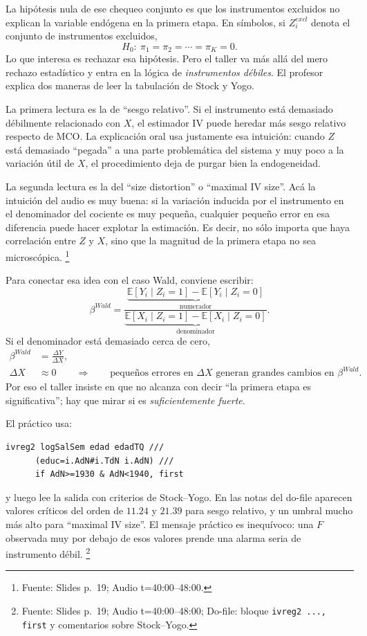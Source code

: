 \documentclass[11pt]{article}
\newcommand{\q}[1]{``#1''}
\newcommand{\E}{\mathbb{E}}
\newcommand{\source}[2]{\footnote{Fuente: Slides p.~#1; Audio t=#2.}}
\newcommand{\sourced}[3]{\footnote{Fuente: Slides p.~#1; Audio t=#2; Do-file: #3.}}
\begin{document}
La hipótesis nula de ese chequeo conjunto es que los instrumentos excluidos no explican la variable endógena en la primera etapa. En símbolos, si \(Z_i^{excl}\) denota el conjunto de instrumentos excluidos,
\[
H_0:\ \pi_1=\pi_2=\cdots=\pi_K=0.
\]
Lo que interesa es rechazar esa hipótesis. Pero el taller va más allá del mero rechazo estadístico y entra en la lógica de \emph{instrumentos débiles}. El profesor explica dos maneras de leer la tabulación de Stock y Yogo.

La primera lectura es la de \q{sesgo relativo}. Si el instrumento está demasiado débilmente relacionado con \(X\), el estimador IV puede heredar más sesgo relativo respecto de MCO. La explicación oral usa justamente esa intuición: cuando \(Z\) está demasiado \q{pegada} a una parte problemática del sistema y muy poco a la variación útil de \(X\), el procedimiento deja de purgar bien la endogeneidad.

La segunda lectura es la del \q{size distortion} o \q{maximal IV size}. Acá la intuición del audio es muy buena: si la variación inducida por el instrumento en el denominador del cociente es muy pequeña, cualquier pequeño error en esa diferencia puede hacer explotar la estimación. Es decir, no sólo importa que haya correlación entre \(Z\) y \(X\), sino que la magnitud de la primera etapa no sea microscópica. \source{19}{40:00--48:00}

Para conectar esa idea con el caso Wald, conviene escribir:
\[
\beta^{Wald}
=
\frac{\underbrace{\E[Y_i\mid Z_i=1]-\E[Y_i\mid Z_i=0]}_{\text{numerador}}}
{\underbrace{\E[X_i\mid Z_i=1]-\E[X_i\mid Z_i=0]}_{\text{denominador}}}.
\]
Si el denominador está demasiado cerca de cero,
\[
\begin{aligned}
\beta^{Wald}
&=\frac{\Delta Y}{\Delta X},\\
\Delta X &\approx 0
\qquad \Rightarrow \qquad
\text{pequeños errores en }\Delta X\text{ generan grandes cambios en }\beta^{Wald}.
\end{aligned}
\]
Por eso el taller insiste en que no alcanza con decir \q{la primera etapa es significativa}; hay que mirar si es \emph{suficientemente fuerte}.

El práctico usa:
\begin{lstlisting}
ivreg2 logSalSem edad edadTQ ///
      (educ=i.AdN#i.TdN i.AdN) ///
      if AdN>=1930 & AdN<1940, first
\end{lstlisting}
y luego lee la salida con criterios de Stock--Yogo. En las notas del do-file aparecen valores críticos del orden de \(11.24\) y \(21.39\) para sesgo relativo, y un umbral mucho más alto para \q{maximal IV size}. El mensaje práctico es inequívoco: una \(F\) observada muy por debajo de esos valores prende una alarma seria de instrumento débil. \sourced{19}{40:00--48:00}{bloque \texttt{ivreg2 ..., first} y comentarios sobre Stock--Yogo}
\end{document}
